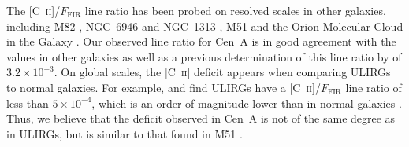 The [C~\textsc{ii}]/$F_{\mathrm{FIR}}$ line ratio has been probed on resolved scales in other galaxies, including M82 \citep[10$^{-3}-10^{-2}$; ][]{2013A&A...549A.118C}, NGC~6946 and NGC~1313 \citep[$8\times 10^{-3}$; ][]{2002AJ....124..751C}, M51 \citep[$4 \times 10^{-3}$; ][]{parkin_2013} and the Orion Molecular Cloud in the Galaxy \citep[$3 \times 10^{-3}$; ][]{1993ApJ...404..219S}.  Our observed line ratio for Cen~A is in good agreement with the values in other galaxies as well as a previous determination of this line ratio by \citet{2001A&A...375..566N} of $3.2 \times 10^{-3}$.  On global scales, the [C~\textsc{ii}] deficit appears when comparing ULIRGs to normal galaxies.  For example, \citet{1998ApJ...504L..11L} and \citet{2003ApJ...594..758L} find ULIRGs have a [C~\textsc{ii}]/$F_{\mathrm{FIR}}$ line ratio of less than $5 \times 10^{-4}$, which is an order of magnitude lower than in normal galaxies \citep{1985ApJ...291..755C, 2001ApJ...561..766M, 2001A&A...375..566N}.  Thus, we believe that the deficit observed in Cen~A is not of the same degree as in ULIRGs, but is similar to that found in M51 \citep{parkin_2013}.

